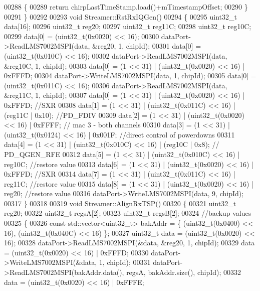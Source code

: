 \begin{DoxyCode}
00288     \{
00289         \textcolor{keywordflow}{return} chirpLastTimeStamp.load()+mTimestampOffset;
00290     \}
00291 \}
00292 
00293 \textcolor{keywordtype}{void} Streamer::RstRxIQGen()
00294 \{
00295     uint32\_t data[16];
00296     uint32\_t reg20;
00297     uint32\_t reg11C;
00298     uint32\_t reg10C;
00299     data[0] = (uint32\_t(0x0020) << 16);
00300     dataPort->ReadLMS7002MSPI(data, &reg20, 1, chipId);
00301     data[0] = (uint32\_t(0x010C) << 16);
00302     dataPort->ReadLMS7002MSPI(data, &reg10C, 1, chipId);
00303     data[0] = (1 << 31) | (uint32\_t(0x0020) << 16) | 0xFFFD;
00304     dataPort->WriteLMS7002MSPI(data, 1, chipId);
00305     data[0] = (uint32\_t(0x011C) << 16);
00306     dataPort->ReadLMS7002MSPI(data, &reg11C, 1, chipId);
00307     data[0] = (1 << 31) | (uint32\_t(0x0020) << 16) | 0xFFFD;             \textcolor{comment}{//SXR}
00308     data[1] = (1 << 31) | (uint32\_t(0x011C) << 16) | (reg11C | 0x10);    \textcolor{comment}{//PD\_FDIV}
00309     data[2] = (1 << 31) | (uint32\_t(0x0020) << 16) | 0xFFFF;             \textcolor{comment}{// mac 3 - both channels}
00310     data[3] = (1 << 31) | (uint32\_t(0x0124) << 16) | 0x001F;             \textcolor{comment}{//direct control of powerdowns}
00311     data[4] = (1 << 31) | (uint32\_t(0x010C) << 16) | (reg10C | 0x8);     \textcolor{comment}{// PD\_QGEN\_RFE}
00312     data[5] = (1 << 31) | (uint32\_t(0x010C) << 16) | reg10C;             \textcolor{comment}{//restore value}
00313     data[6] = (1 << 31) | (uint32\_t(0x0020) << 16) | 0xFFFD;             \textcolor{comment}{//SXR}
00314     data[7] = (1 << 31) | (uint32\_t(0x011C) << 16) | reg11C;             \textcolor{comment}{//restore value}
00315     data[8] = (1 << 31) | (uint32\_t(0x0020) << 16) | reg20;              \textcolor{comment}{//restore value}
00316     dataPort->WriteLMS7002MSPI(data, 9, chipId);
00317 \}
00318 
00319 \textcolor{keywordtype}{void} Streamer::AlignRxTSP()
00320 \{
00321     uint32\_t reg20;
00322     uint32\_t regsA[2];
00323     uint32\_t regsB[2];
00324     \textcolor{comment}{//backup values}
00325     \{
00326         \textcolor{keyword}{const} std::vector<uint32\_t> bakAddr = \{ (uint32\_t(0x0400) << 16), (uint32\_t(0x040C) << 16) \};
00327         uint32\_t data = (uint32\_t(0x0020) << 16);
00328         dataPort->ReadLMS7002MSPI(&data, &reg20, 1, chipId);
00329         data = (uint32\_t(0x0020) << 16) | 0xFFFD;
00330         dataPort->WriteLMS7002MSPI(&data, 1, chipId);
00331         dataPort->ReadLMS7002MSPI(bakAddr.data(), regsA, bakAddr.size(), chipId);
00332         data = (uint32\_t(0x0020) << 16) | 0xFFFE;

\end{DoxyCode}
